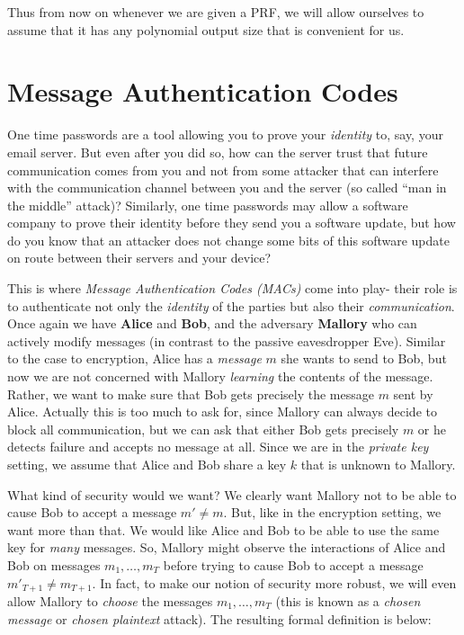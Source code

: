 Thus from now on whenever we are given a PRF, we will allow ourselves to
assume that it has any polynomial output size that is convenient for us.

\section{Message Authentication Codes}\label{4-Message-Authentication}

One time passwords are a tool allowing you to prove your \emph{identity}
to, say, your email server. But even after you did so, how can the
server trust that future communication comes from you and not from some
attacker that can interfere with the communication channel between you
and the server (so called ``man in the middle'' attack)? Similarly, one
time passwords may allow a software company to prove their identity
before they send you a software update, but how do you know that an
attacker does not change some bits of this software update on route
between their servers and your device?

This is where \emph{Message Authentication Codes (MACs)} come into play-
their role is to authenticate not only the \emph{identity} of the
parties but also their \emph{communication}. Once again we have
\textbf{Alice} and \textbf{Bob}, and the adversary \textbf{Mallory} who
can actively modify messages (in contrast to the passive eavesdropper
Eve). Similar to the case to encryption, Alice has a \emph{message}
\(m\) she wants to send to Bob, but now we are not concerned with
Mallory \emph{learning} the contents of the message. Rather, we want to
make sure that Bob gets precisely the message \(m\) sent by Alice.
Actually this is too much to ask for, since Mallory can always decide to
block all communication, but we can ask that either Bob gets precisely
\(m\) or he detects failure and accepts no message at all. Since we are
in the \emph{private key} setting, we assume that Alice and Bob share a
key \(k\) that is unknown to Mallory.

What kind of security would we want? We clearly want Mallory not to be
able to cause Bob to accept a message \(m'\neq m\). But, like in the
encryption setting, we want more than that. We would like Alice and Bob
to be able to use the same key for \emph{many} messages. So, Mallory
might observe the interactions of Alice and Bob on messages
\(m_1,\ldots,m_T\) before trying to cause Bob to accept a message
\(m'_{T+1} \neq m_{T+1}\). In fact, to make our notion of security more
robust, we will even allow Mallory to \emph{choose} the messages
\(m_1,\ldots,m_T\) (this is known as a \emph{chosen message} or
\emph{chosen plaintext} attack). The resulting formal definition is
below:

